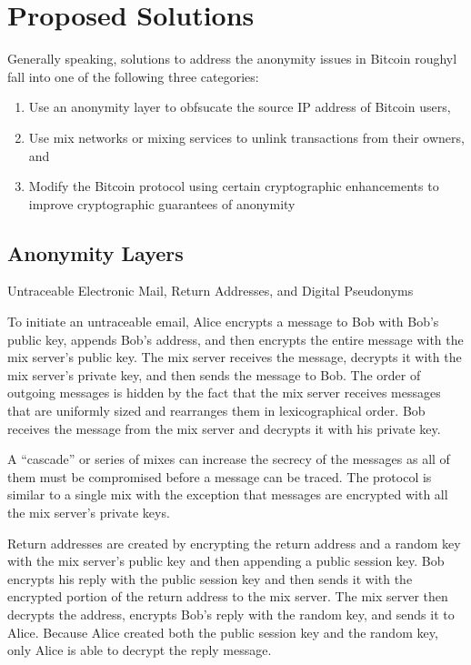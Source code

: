 \section{Proposed Solutions}
Generally speaking, solutions to address the anonymity issues in Bitcoin roughyl fall into one of the following three categories:
\begin{enumerate}
	\item Use an anonymity layer to obfsucate the source IP address of Bitcoin users,
	\item Use mix networks or mixing services to unlink transactions from their owners, and
	\item Modify the Bitcoin protocol using certain cryptographic enhancements to improve cryptographic guarantees of anonymity
\end{enumerate}

\subsection{Anonymity Layers}

Untraceable Electronic Mail, Return Addresses, and Digital Pseudonyms

To initiate an untraceable email, Alice encrypts a message to Bob with Bob’s public key, appends Bob’s address, and then encrypts the entire message with the mix server’s public key.  The mix server receives the message, decrypts it with the mix server’s private key, and then sends the message to Bob.  The order of outgoing messages is hidden by the fact that the mix server receives messages that are uniformly sized and rearranges them in lexicographical order.  Bob receives the message from the mix server and decrypts it with his private key.

A “cascade” or series of mixes can increase the secrecy of the messages as all of them must be compromised before a message can be traced.  The protocol is similar to a single mix with the exception that messages are encrypted with all the mix server’s private keys.

Return addresses are created by encrypting the return address and a random key with the mix server’s public key and then appending a public session key.  Bob encrypts his reply with the public session key and then sends it with the encrypted portion of the return address to the mix server.  The mix server then decrypts the address, encrypts Bob’s reply with the random key, and sends it to Alice.  Because Alice created both the public session key and the random key, only Alice is able to decrypt the reply message.

